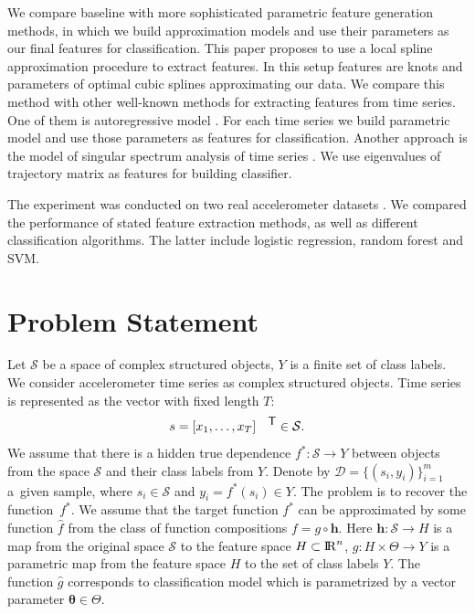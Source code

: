 \documentclass{llncs}
\newcommand{\T}{{\mbox{\footnotesize\sffamily\upshape\mdseries T}}}
\begin{document}
We compare baseline with more sophisticated parametric feature generation methods, in which we build approximation models and use their parameters as our final features for classification. 
This paper proposes to use a local spline approximation procedure to extract features.
In this setup features are knots and parameters of optimal cubic splines approximating our data. 
We compare this method with other well-known methods for extracting features from time series.
One of them is autoregressive model \cite{lukashin2003adaptive}. 
For each time series we build parametric model and use those parameters as features for classification. 
Another approach is the model of singular spectrum analysis of time series \cite{hassani2007singular}. 
We use eigenvalues of trajectory matrix as features for building classifier. 

The experiment was conducted on two real accelerometer datasets \cite{wisdm,usc}. 
We compared the performance of stated feature extraction methods, as well as different classification algorithms. 
The latter include logistic regression, random forest and SVM.


\section{Problem Statement}
Let $\mathcal{S}$ be a space of complex structured objects, $Y$ is a finite set of class labels. 
We consider accelerometer time series as complex structured objects. Time series is represented as the vector with fixed length $T$:
\begin{equation}
s = [x_1, \dots, x_T]^{\T} \in \mathcal{S}.
\label{eq::time_series}
\end{equation}
We assume that there is a hidden true dependence $f^*: \mathcal{S} \rightarrow Y$ between objects from the space $\mathcal{S}$ and their class labels from $Y$.
Denote by $\mathcal{D} = \{(s_i, y_i)\}_{i=1}^m$ a~given sample, where $s_i \in \mathcal{S}$ and $y_i = f^*(s_i)\in Y$.
The problem is to recover the function~$f^*$. 
We assume that the target function $f^*$ can be approximated by some function $\hat{f}$ from the class of function compositions $f = g \circ \bm{h}$. 
Here $\bm{h}: \mathcal{S} \rightarrow H$ is a map from the original space $\mathcal{S}$ to the feature space $H \subset {\rm I\!R}^n$,
$g: H \times \Theta \rightarrow Y$ is a parametric map from the feature space $H$ to the set of class labels $Y$. 
The function $\hat{g}$ corresponds to classification model which is parametrized by a vector parameter $\boldsymbol{\theta} \in \Theta$. 
\end{document}

